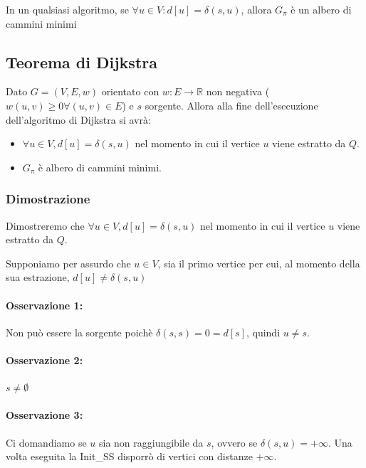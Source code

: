 \documentclass[tikz]{article}
\providecommand{\tightlist}{%
  \setlength{\itemsep}{0pt}\setlength{\parskip}{0pt}}
\let\oldparagraph\paragraph
\renewcommand{\paragraph}[1]{\oldparagraph{#1}\mbox{}}
\begin{document}
{{{In un qualsiasi algoritmo, se $\forall u \in V: d[u] = \delta(s,u)$, allora $G_\pi$ è un albero di cammini minimi}

\subsection{Teorema di Dijkstra}

{Dato $G=(V,E,w)$ orientato con $w:E\rightarrow \mathbb{R}$ non negativa ($w(u,v) \geq 0 \forall (u,v) \in E$) e $s$ sorgente. Allora alla fine dell'esecuzione dell'algoritmo di Dijkstra si avrà:}

\begin{itemize}
\tightlist
\item
{$\forall u \in V, d[u]=\delta(s,u)$ nel momento in cui il vertice $u$ viene estratto da $Q$.}
\item
{$G_\pi$ è albero di cammini minimi.}
\end{itemize}

\subsubsection{Dimostrazione}

{Dimostreremo che $\forall u \in V, d[u]=\delta(s,u)$ nel momento in cui il vertice $u$ viene estratto da $Q$.}

{Supponiamo per assurdo che $u\in V$, sia il primo vertice per cui, al momento della sua estrazione, $d[u] \neq \delta(s,u)$}

\paragraph{Osservazione 1:}

{Non può essere la sorgente poichè $\delta(s,s)=0=d[s]$, quindi $u\neq s$.}

\paragraph{Osservazione 2:}

$s \neq \emptyset$

\paragraph{Osservazione 3:}

Ci domandiamo se $u$ sia non raggiungibile da $s$, ovvero se $\delta(s,u)=+\infty$.
Una volta eseguita la Init\_SS disporrò di vertici con distanze $+\infty$.

}}
\end{document}
